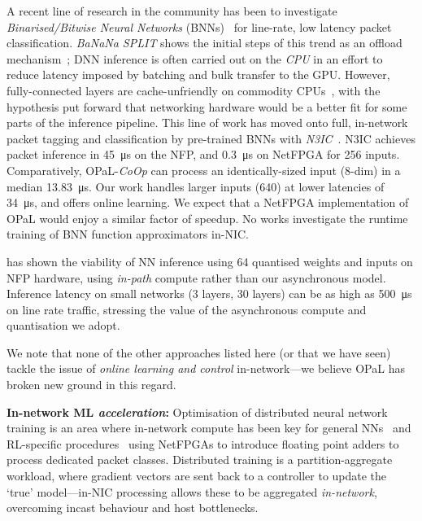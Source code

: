\documentclass[
sigconf,natbib=false
]{acmart}
\newcommand{\fakepara}[1]{\noindent\textbf{#1:}}
\newcommand{\approachshort}{OPaL}
\newcommand{\Coopfw}{\emph{CoOp}}
\begin{document}
A recent line of research in the community has been to investigate \emph{Binarised/Bitwise Neural Networks} (BNNs)~\parencite{DBLP:conf/nips/HubaraCSEB16,DBLP:journals/corr/KimS16,DBLP:journals/corr/MiyashitaLM16} for line-rate, low latency packet classification.
\emph{BaNaNa SPLIT} shows the initial steps of this trend as an offload mechanism~\parencite{DBLP:conf/sigcomm/SanvitoSB18,DBLP:journals/corr/abs-1801-05731}; DNN inference is often carried out on the \emph{CPU} in an effort to reduce latency imposed by batching and bulk transfer to the GPU.
However, fully-connected layers are cache-unfriendly on commodity CPUs~\parencite{DBLP:conf/sigcomm/SanvitoSB18}, with the hypothesis put forward that networking hardware would be a better fit for some parts of the inference pipeline.
This line of work has moved onto full, in-network packet tagging and classification by pre-trained BNNs with \emph{N3IC}~\parencite{DBLP:journals/corr/abs-2009-02353}.
N3IC achieves packet inference in \SI{45}{\micro\second} on the NFP, and \SI{0.3}{\micro\second} on NetFPGA for \SI{256}{\bit} inputs.
Comparatively, \approachshort{}-\Coopfw{} can process an identically-sized input (8-dim) in a median \SI{13.83}{\micro\second}.
Our work handles larger inputs (\SI{640}{\bit}) at lower latencies of \SI{34}{\micro\second}, and offers online learning.
We expect that a NetFPGA implementation of \approachshort{} would enjoy a similar factor of speedup.
No works investigate the runtime training of BNN function approximators in-NIC.

\textcite{langlet-ml-netronome} has shown the viability of NN inference using \SI{64}{\bit} quantised weights and inputs on NFP hardware, using \emph{in-path} compute rather than our asynchronous model.
Inference latency on small networks (3 layers, \num{30} layers) can be as high as \SI{500}{\micro\second} on line rate traffic, stressing the value of the asynchronous compute and quantisation we adopt.

We note that none of the other approaches listed here (or that we have seen) tackle the issue of \emph{online learning and control} in-network---we believe \approachshort{} has broken new ground in this regard.

\fakepara{In-network ML \emph{acceleration}}
Optimisation of distributed neural network training is an area where in-network compute has been key for general NNs~\parencite{DBLP:conf/micro/LiPAYQPWSEK18} and RL-specific procedures~\parencite{DBLP:conf/isca/LiLYCSH19} using NetFPGAs to introduce floating point adders to process dedicated packet classes.
Distributed training is a partition-aggregate workload, where gradient vectors are sent back to a controller to update the `true' model---in-NIC processing allows these to be aggregated \emph{in-network}, overcoming incast behaviour and host bottlenecks.
\end{document}

